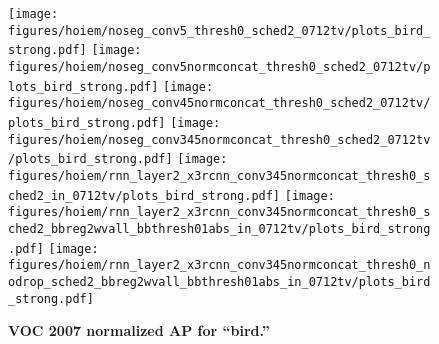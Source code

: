 \begin{figure}[t]
  \begin{center}
   \texttt{[image: figures/hoiem/noseg\_conv5\_thresh0\_sched2\_0712tv/plots\_bird\_strong.pdf]}
   \texttt{[image: figures/hoiem/noseg\_conv5normconcat\_thresh0\_sched2\_0712tv/plots\_bird\_strong.pdf]}
   \texttt{[image: figures/hoiem/noseg\_conv45normconcat\_thresh0\_sched2\_0712tv/plots\_bird\_strong.pdf]}
   \texttt{[image: figures/hoiem/noseg\_conv345normconcat\_thresh0\_sched2\_0712tv/plots\_bird\_strong.pdf]}
   \texttt{[image: figures/hoiem/rnn\_layer2\_x3rcnn\_conv345normconcat\_thresh0\_sched2\_in\_0712tv/plots\_bird\_strong.pdf]}
   \texttt{[image: figures/hoiem/rnn\_layer2\_x3rcnn\_conv345normconcat\_thresh0\_sched2\_bbreg2wvall\_bbthresh01abs\_in\_0712tv/plots\_bird\_strong.pdf]}
   \texttt{[image: figures/hoiem/rnn\_layer2\_x3rcnn\_conv345normconcat\_thresh0\_nodrop\_sched2\_bbreg2wvall\_bbthresh01abs\_in\_0712tv/plots\_bird\_strong.pdf]}
  \end{center}
  \vspace{-12pt}
  \caption{\textbf{VOC 2007 normalized AP for ``bird.''}
  }
  \label{fig:hoiem}
\end{figure}
